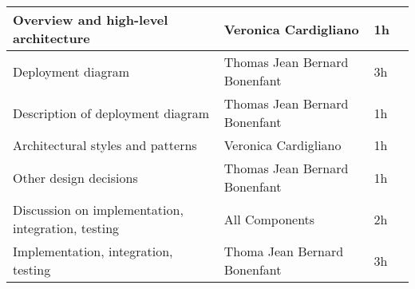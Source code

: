 \begin{table}[H]
\begin{tabular}{|l|l|l|l|}
\\ \hline
Overview and high-level architecture & Veronica Cardigliano & 1h      
\\ \hline
Deployment diagram & Thomas Jean Bernard Bonenfant & 3h                                                                                                                                                                                                                                                                            \\ \hline
Description of deployment diagram & Thomas Jean Bernard Bonenfant & 1h                                                                                                                                                                                                                                                                               \\ \hline
Architectural styles and patterns    & Veronica Cardigliano          & 1h                                                                                                                                                                                                                                                                                     \\ \hline
Other design decisions    & Thomas Jean Bernard Bonenfant & 1h   
\\ \hline   
Discussion on implementation, integration, testing & All Components  & 2h
\\ \hline                                                                                                                                                                                                                                                                                                                                                                                                                                                                                                                                                                                                                                                                                                                                                                                                                            
Implementation, integration, testing & Thoma Jean Bernard Bonenfant  & 3h                                                                                                                                                                                                                                                                                                                                                                                                                                                                                                                                                 \\ \hline
\end{tabular}
\end{table}